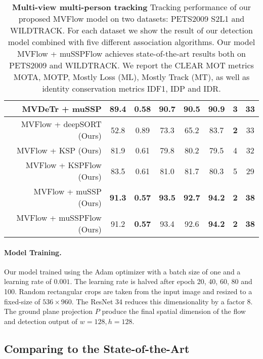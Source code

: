 \documentclass[10pt,twocolumn,letterpaper]{article}
\begin{document}
\begin{table*}[h]
\begin{center}
\begin{tabular}{r  c c c c c c c }
    MVDeTr \cite{hou2021multiview} + muSSP & 89.4 & 0.58 & 90.7 & 90.5 & 90.9 & 3 & 33 \\  
    \midrule
    MVFlow + deepSORT (Ours) & 52.8 & 0.89 & 73.3 & 65.2 & 83.7 & \textbf{2} & 33  \\
    MVFlow + KSP (Ours) & 81.9 & 0.61 & 79.8 & 80.2 & 79.5 & 4 & 32  \\
    MVFlow + KSPFlow (Ours) & 83.5 & 0.61 & 81.0 & 81.7 & 80.3 & 5 & 29  \\
    MVFlow + muSSP (Ours) & \textbf{91.3} & \textbf{0.57} & \textbf{93.5} & \textbf{92.7} & \textbf{94.2} & \textbf{2} & \textbf{38} \\
    MVFlow + muSSPFlow (Ours) & 91.2 & \textbf{0.57} & 93.4 & 92.6 & \textbf{94.2} & \textbf{2} & \textbf{38} \\
   


\bottomrule
    \end{tabular}
    \end{center}
      \caption{\textbf{Multi-view multi-person tracking} Tracking performance of our proposed MVFlow model
      on two datasets: PETS2009 S2L1 and WILDTRACK. For each dataset we show the result of our detection model combined with 
      five different association algorithms. Our model MVFlow + muSSPFlow achieves state-of-the-art results both on PETS2009 and WILDTRACK.
      We report the CLEAR MOT metrics MOTA, MOTP, Mostly Loss (ML), Mostly Track (MT), as well as identity conservation metrics IDF1, IDP and IDR.
      }  
     \label{tab:mvmtracking}
    \end{table*}

 
\paragraph{Model Training.}

Our model trained using the Adam optimizer \cite{Kingma15} with a batch size of one and a learning rate of $0.001$. The learning rate is halved after epoch 20, 40, 60, 80 and 100. 
Random rectangular crops are taken from the input image and resized to a fixed-size of  $536 \times 960$. The ResNet 34 \cite{He16a} reduces this dimensionality by a factor 8.
The ground plane projection $P$ produce the final spatial dimension of the flow and detection output of $w=128, h=128$.

\subsection{Comparing to the State-of-the-Art}
\end{document}
